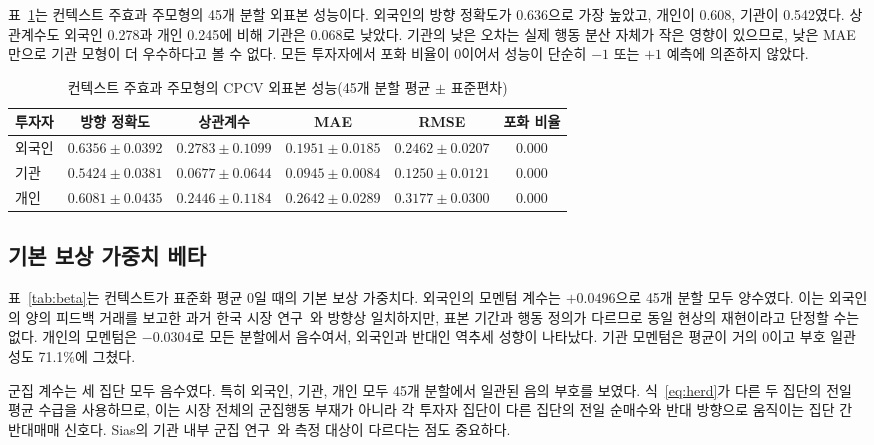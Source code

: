 \documentclass[sigconf,nonacm]{acmart}
\begin{document}
표~\ref{tab:performance}는 컨텍스트 주효과 주모형의 45개 분할 외표본 성능이다.
외국인의 방향 정확도가 0.636으로 가장 높았고, 개인이 0.608, 기관이 0.542였다.
상관계수도 외국인 0.278과 개인 0.245에 비해 기관은 0.068로 낮았다. 기관의 낮은
오차는 실제 행동 분산 자체가 작은 영향이 있으므로, 낮은 MAE만으로 기관 모형이
더 우수하다고 볼 수 없다. 모든 투자자에서 포화 비율이 0이어서 성능이 단순히
$-1$ 또는 $+1$ 예측에 의존하지 않았다.

\begin{table}[t]
  \caption{컨텍스트 주효과 주모형의 CPCV 외표본 성능(45개 분할 평균 $\pm$ 표준편차)}
  \label{tab:performance}
  \centering
  \small
  \begin{tabular}{@{}lccccc@{}}
    \toprule
    투자자 & 방향 정확도 & 상관계수 & MAE & RMSE & 포화 비율 \\
    \midrule
    외국인 & $0.6356\pm0.0392$ & $0.2783\pm0.1099$ & $0.1951\pm0.0185$ & $0.2462\pm0.0207$ & $0.000$ \\
    기관   & $0.5424\pm0.0381$ & $0.0677\pm0.0644$ & $0.0945\pm0.0084$ & $0.1250\pm0.0121$ & $0.000$ \\
    개인   & $0.6081\pm0.0435$ & $0.2446\pm0.1184$ & $0.2642\pm0.0289$ & $0.3177\pm0.0300$ & $0.000$ \\
    \bottomrule
  \end{tabular}
\end{table}

\subsection{기본 보상 가중치 베타}

표~\ref{tab:beta}는 컨텍스트가 표준화 평균 0일 때의 기본 보상 가중치다. 외국인의
모멘텀 계수는 $+0.0496$으로 45개 분할 모두 양수였다. 이는 외국인의 양의 피드백
거래를 보고한 과거 한국 시장 연구~\cite{choe1999foreign}와 방향상 일치하지만,
표본 기간과 행동 정의가 다르므로 동일 현상의 재현이라고 단정할 수는 없다. 개인의
모멘텀은 $-0.0304$로 모든 분할에서 음수여서, 외국인과 반대인 역추세 성향이
나타났다. 기관 모멘텀은 평균이 거의 0이고 부호 일관성도 71.1\%에 그쳤다.

군집 계수는 세 집단 모두 음수였다. 특히 외국인, 기관, 개인 모두 45개 분할에서
일관된 음의 부호를 보였다. 식~\ref{eq:herd}가 다른 두 집단의 전일 평균 수급을
사용하므로, 이는 시장 전체의 군집행동 부재가 아니라 각 투자자 집단이 다른 집단의
전일 순매수와 반대 방향으로 움직이는 집단 간 반대매매 신호다. Sias의 기관 내부
군집 연구~\cite{sias2004institutional}와 측정 대상이 다르다는 점도 중요하다.
\end{document}
